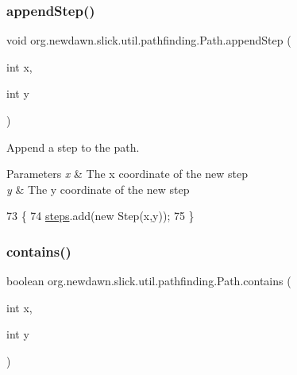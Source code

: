 \subsubsection{\texorpdfstring{append\+Step()}{appendStep()}}
{\footnotesize\ttfamily void org.\+newdawn.\+slick.\+util.\+pathfinding.\+Path.\+append\+Step (\begin{DoxyParamCaption}\item[{int}]{x,  }\item[{int}]{y }\end{DoxyParamCaption})\hspace{0.3cm}{\ttfamily [inline]}}

Append a step to the path. ~\newline
 
\begin{DoxyParams}{Parameters}
{\em x} & The x coordinate of the new step \\
\hline
{\em y} & The y coordinate of the new step \\
\hline
\end{DoxyParams}

\begin{DoxyCode}
73                                          \{
74         \mbox{\hyperlink{classorg_1_1newdawn_1_1slick_1_1util_1_1pathfinding_1_1_path_ac2472e1febece895b3e77854043fb4ad}{steps}}.add(\textcolor{keyword}{new} Step(x,y));
75     \}
\end{DoxyCode}
\mbox{\label{classorg_1_1newdawn_1_1slick_1_1util_1_1pathfinding_1_1_path_a74af06518bbc01b02caa8ffa2acc7edb}} 
\subsubsection{\texorpdfstring{contains()}{contains()}}
{\footnotesize\ttfamily boolean org.\+newdawn.\+slick.\+util.\+pathfinding.\+Path.\+contains (\begin{DoxyParamCaption}\item[{int}]{x,  }\item[{int}]{y }\end{DoxyParamCaption})\hspace{0.3cm}{\ttfamily [inline]}}

